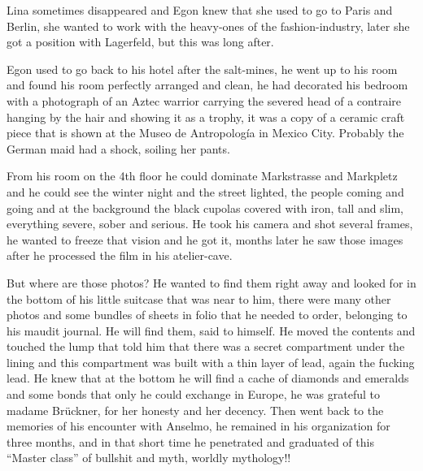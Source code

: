 \documentclass[smalldemyvopaper,11pt,twoside,onecolumn,openright,extrafontsizes]{memoir}
\begin{document}
Lina sometimes disappeared and Egon knew that she used to go to Paris and Berlin, she wanted to work with the heavy-ones of the fashion-industry, later she got a position with Lagerfeld, but this was long after.

Egon used to go back to his hotel after the salt-mines, he went up to his room and found his room perfectly arranged and clean, he had decorated his bedroom with a photograph of an Aztec warrior carrying the severed head of a contraire hanging by the hair and showing it as a trophy, it was a copy of a ceramic craft piece that is shown at the Museo de Antropología in Mexico City. Probably the German maid had a shock, soiling her pants.

From his room on the 4th floor he could dominate Markstrasse and Markpletz and he could see the winter night and the street lighted, the people coming and going and at the background the black cupolas covered with iron, tall and slim, everything severe, sober and serious. He took his camera and shot several frames, he wanted to freeze that vision and he got it, months later he saw those images after he processed the film in his atelier-cave.

But where are those photos? He wanted to find them right away and looked for in the bottom of his little suitcase that was near to him, there were many other photos and some bundles of sheets in folio that he needed to order, belonging to his maudit journal. He will find them, said to himself. He moved the contents and touched the lump that told him that there was a secret compartment under the lining and this compartment was built with a thin layer of lead, again the fucking lead. He knew that at the bottom he will find a cache of diamonds and emeralds and some bonds that only he could exchange in Europe, he was grateful to madame Brückner, for her honesty and her decency. Then went back to the memories of his encounter with Anselmo, he remained in his organization for three months, and in that short time he penetrated and graduated of this “Master class” of bullshit and myth, worldly mythology!!
\end{document}
